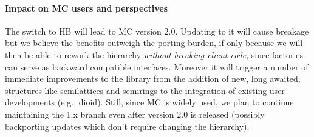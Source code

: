 \documentclass{easychair}
\def\MC{{\sf MC}}
\def\HB{{\sf HB}}
\begin{document}
\paragraph{Impact on \MC{} users and perspectives}

The switch to \HB{} will lead to \MC{} version 2.0. Updating to it will cause
breakage but we believe the benefits outweigh the porting burden,
if only because we will then be able to rework the hierarchy
\emph{without breaking client code}, since factories can serve as backward
compatible interfaces. Moreover it will trigger a number
of immediate improvements to the library from the addition of new, long awaited,
structures like semilattices and semirings to the integration of existing user
developments (e.g., dioid).
%
Still, since \MC{} is widely used, we plan to continue
maintaining the 1.x branch even after version 2.0 is released
(possibly backporting updates which don't require changing the hierarchy).

\label{sect:bib}

%
%
%


\end{document}
